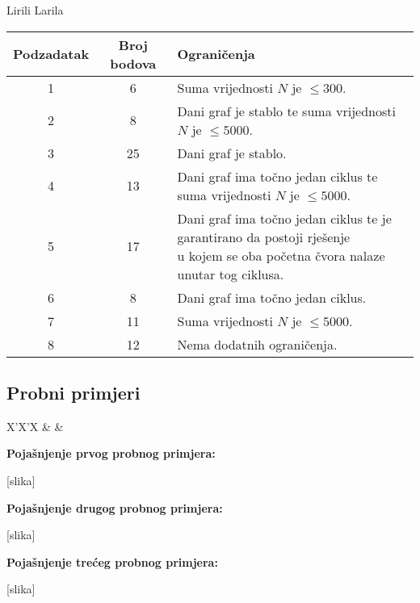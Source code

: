 \begin{statement}[
  problempoints=100,
  timelimit=3 sekunde,
  memorylimit=512 MiB,
]{Lirili Larila}
{\renewcommand{\arraystretch}{1.4}
  \setlength{\tabcolsep}{6pt}
  \begin{tabular}{ccl}
   Podzadatak & Broj bodova & Ograničenja \\ \midrule
    1 & 6 & Suma vrijednosti $N$ je $\leq 300$. \\
    2 & 8 & Dani graf je stablo te suma vrijednosti $N$ je $\leq 5000$. \\
    3 & 25 & Dani graf je stablo. \\
    4 & 13 & Dani graf ima točno jedan ciklus te suma vrijednosti $N$ je $\leq 5000$. \\[5pt]
    5 & 17 & \makecell[l]{Dani graf ima točno jedan ciklus te je garantirano da postoji rješenje \\ u kojem se oba početna čvora nalaze unutar tog ciklusa.}  \\[6pt]
    6 & 8 & Dani graf ima točno jedan ciklus. \\
    7 & 11 & Suma vrijednosti $N$ je $\leq 5000$. \\
    8 & 12 & Nema dodatnih ograničenja. \\
\end{tabular}}

\subsection*{Probni primjeri}
\begin{tabularx}{\textwidth}{X'X'X}
 &
 &
\end{tabularx}

\textbf{Pojašnjenje prvog probnog primjera:}

[slika]

\textbf{Pojašnjenje drugog probnog primjera:}

[slika]

\textbf{Pojašnjenje trećeg probnog primjera:}

[slika]

\end{statement}

